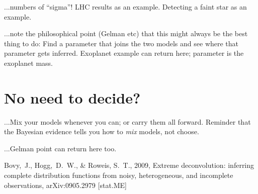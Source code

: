 \documentclass[12pt,twoside]{article}
\begin{document}
...numbers of ``sigma''!  LHC results as an example.  Detecting a
faint star as an example.

...note the philosophical point (Gelman etc) that this might always be
the best thing to do: Find a parameter that joins the two models and
see where that parameter gets inferred.  Exoplanet example can return
here; parameter is the exoplanet mass.

\section{No need to decide?}

...Mix your models whenever you can; or carry them all forward.  Reminder
that the Bayesian evidence tells you how to \emph{mix} models, not
choose.

...Gelman point can return here too.

\clearpage
{}\theendnotes

\clearpage
\begin{thebibliography}{}
  Bovy,~J., Hogg,~D.~W., \& Roweis, S.~T., 2009,
  Extreme deconvolution: inferring complete distribution functions from noisy, heterogeneous, and incomplete observations, 
  arXiv:0905.2979 [stat.ME]
\end{thebibliography}
\end{document}
